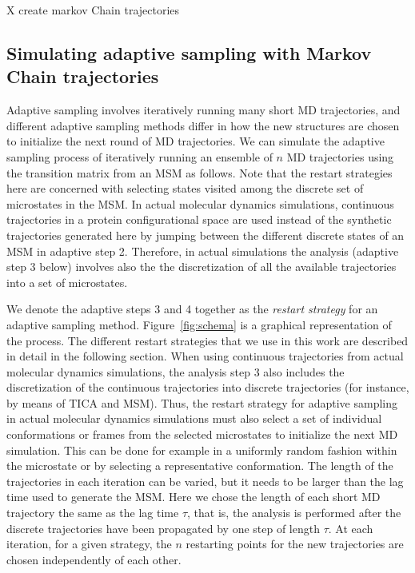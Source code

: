 X create markov Chain trajectories

\subsection{\label{sec:level5}Simulating adaptive sampling with Markov Chain trajectories}
Adaptive sampling involves iteratively running many short MD trajectories, and
different adaptive sampling methods differ in how the new structures are chosen
to initialize the next round of MD trajectories. We can simulate the adaptive
sampling process of iteratively running an ensemble of $n$ MD trajectories 
using the transition matrix from an MSM as follows. 
Note that the restart strategies here are concerned with selecting states
visited among the discrete set of microstates in the MSM. 
In actual molecular dynamics simulations, continuous trajectories in a protein
configurational space are used instead of the synthetic trajectories generated here
by jumping between the different discrete states of an MSM in adaptive step 2.
Therefore, in actual simulations the analysis (adaptive step 3 below) involves also the
the discretization of all the available trajectories into a set of microstates.


We denote the adaptive steps 3 and 4 together as the \emph{restart strategy} for an
adaptive sampling method. Figure~\ref{fig:schema} is a graphical representation
of the process. The different restart strategies that we use in this work are
described in detail in the following section. When using continuous trajectories from actual molecular dynamics simulations,
the analysis step 3 also includes the discretization of the continuous
trajectories into discrete trajectories (for instance, by means of TICA and MSM).
Thus, the restart strategy for adaptive sampling in actual molecular dynamics
simulations must also select a set of individual conformations or frames from the selected
microstates to initialize the next MD simulation. This can be done for example in
a uniformly random fashion within the microstate or by selecting a representative
conformation. 
The length of the trajectories in each iteration can be varied, but it needs to
be larger than the lag time used to generate the MSM.
Here we chose the length of each short MD trajectory the same as the lag time
$\tau$, that is, the analysis is performed after the discrete trajectories have
been propagated by one step of length $\tau$. 
At each iteration, for a given strategy, the $n$ restarting points for the new
trajectories are chosen independently of each other.

